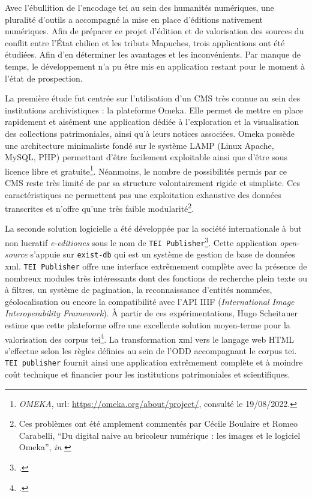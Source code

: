 	Avec l'ébullition de l'encodage \gls{tei} au sein des humanités numériques, une pluralité d'outils a accompagné la mise en place d'éditions nativement numériques. Afin de préparer ce projet d'édition et de valorisation des sources du conflit entre l'État chilien et les tributs Mapuches, trois applications ont été étudiées. Afin d'en déterminer les avantages et les inconvénients. Par manque de temps, le développement n'a pu être mis en application restant pour le moment à l'état de prospection.
	
	La première étude fut centrée sur l'utilisation d'un \gls{CMS} très connue au sein des institutions archivistiques : la plateforme Omeka. Elle permet de mettre en place rapidement et aisément une application dédiée à l'exploration et la visualisation des collections patrimoniales, ainsi qu'à leurs notices associées. Omeka possède une architecture minimaliste fondé sur le système LAMP (Linux Apache, MySQL, PHP) permettant d'être facilement exploitable ainsi que d'être sous licence libre et gratuite\footnote{\textit{OMEKA}, url: \url{https://omeka.org/about/project/}, consulté le 19/08/2022.}. Néanmoins, le nombre de possibilités permis par ce \gls{CMS} reste très limité de par sa structure volontairement rigide et simpliste. Ces caractéristiques ne permettent pas une exploitation exhaustive des données transcrites et n'offre qu'une très faible modularité\footnote{Ces problèmes ont été amplement commentés par Cécile Boulaire et Romeo Carabelli, \enquote{Du digital naive au bricoleur numérique : les images et le logiciel Omeka}, \textit{in} \cite{cavalieExperimenterHumanitesNumeriques2018}}.
	
	La seconde solution logicielle a été développée par la société internationale à but non lucratif \textit{e-editiones} sous le nom de \texttt{TEI Publisher}\footcite{TEIPublisher2022}. Cette application \textit{open-source} s'appuie sur \texttt{exist-db} qui est un système de gestion de base de données \gls{xml}. \texttt{TEI Publisher} offre une interface extrêmement complète avec la présence de nombreux modules très intéressants dont des fonctions de recherche plein texte ou à filtres, un système de pagination, la reconnaissance d'entités nommées, géolocalisation ou encore la compatibilité avec l'\gls{API} IIIF (\textit{International Image Interoperability Framework}). À partir de ces expérimentations, Hugo Scheitauer estime que cette plateforme offre une excellente solution moyen-terme pour la valorisation des corpus \gls{tei}\footcite[p.~139-143]{scheithauerReconnaissanceEntitesNommees2021}. La transformation \gls{xml} vers le langage web HTML s'effectue selon les règles définies au sein de l'\gls{ODD} accompagnant le corpus \gls{tei}. \texttt{TEI publisher} fournit ainsi une application extrêmement complète et à moindre coût technique et financier pour les institutions patrimoniales et scientifiques.
	
